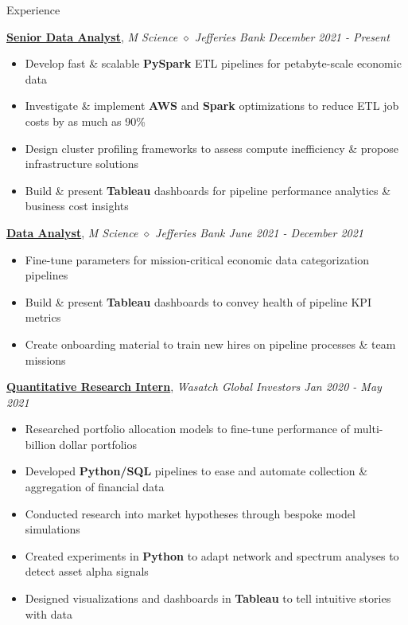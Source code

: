 \documentclass{resume/resume}
\begin{document}
\begin{rSection}{Experience}

    \href{https://mscience.com/}{\bf Senior Data Analyst}, {\em M Science $\diamond$ Jefferies Bank \hfill December 2021 - Present}
    \vspace{-6pt}
    \begin{itemize}[nosep]
        \item Develop fast \& scalable {\bf PySpark} ETL pipelines for petabyte-scale economic data
        \item Investigate \& implement {\bf AWS} and {\bf Spark} optimizations to reduce ETL job costs by as much as 90\%
        \item Design cluster profiling frameworks to assess compute inefficiency \& propose infrastructure solutions
        \item Build \& present {\bf Tableau} dashboards for pipeline performance analytics \& business cost insights
    \end{itemize}

    \href{https://mscience.com/}{\bf Data Analyst}, {\em M Science $\diamond$ Jefferies Bank \hfill June 2021 - December 2021}
    \vspace{-6pt}
    \begin{itemize}[nosep]
        \item Fine-tune parameters for mission-critical economic data categorization pipelines
        \item Build \& present {\bf Tableau} dashboards to convey health of pipeline KPI metrics
        \item Create onboarding material to train new hires on pipeline processes \& team missions
    \end{itemize}

    \href{https://wasatchglobal.com/}{\bf Quantitative Research Intern}, {\em Wasatch Global Investors \hfill Jan 2020 - May 2021}
    \vspace{-6pt}
    \begin{itemize}[nosep]
        \item Researched portfolio allocation models to fine-tune performance of multi-billion dollar portfolios
        \item Developed {\bf Python/SQL} pipelines to ease and automate collection \& aggregation of financial data
        \item Conducted research into market hypotheses through bespoke model simulations
        \item Created experiments in {\bf Python} to adapt network and spectrum analyses to detect asset alpha signals
         \item Designed visualizations and dashboards in {\bf Tableau} to tell intuitive stories with data
    \end{itemize}


\end{rSection}
\end{document}
